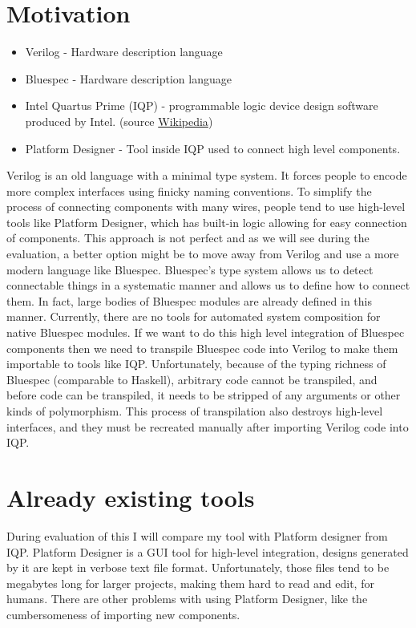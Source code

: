 \documentclass[12pt]{report}
\begin{document}
\section{Motivation}
\begin{tcolorbox}[title=Vocabulary]
    \begin{itemize}
        \item Verilog - Hardware description language
        \item Bluespec - Hardware description language
        \item Intel Quartus Prime (IQP) - programmable logic device design software produced by Intel. (source \href{https://en.wikipedia.org/wiki/Intel_Quartus_Prime}{Wikipedia})
        \item Platform Designer - Tool inside IQP used to connect high level components.
    \end{itemize}
\end{tcolorbox}
Verilog is an old language with a minimal type system. It forces people to encode more complex interfaces using finicky naming conventions. To simplify the process of connecting components with many wires, people tend to use high-level tools like Platform Designer, which has built-in logic allowing for easy connection of components. This approach is not perfect and as we will see during the evaluation, a better option might be to move away from Verilog and use a more modern language like Bluespec. Bluespec's type system allows us to detect connectable things in a systematic manner and allows us to define how to connect them. In fact, large bodies of Bluespec modules are already defined in this manner. Currently, there are no tools for automated system composition for native Bluespec modules. If we want to do this high level integration of Bluespec components then we need to transpile Bluespec code into Verilog to make them importable to tools like IQP. Unfortunately, because of the typing richness of Bluespec (comparable to Haskell), arbitrary code cannot be transpiled, and before code can be transpiled, it needs to be stripped of any arguments or other kinds of polymorphism. This process of transpilation also destroys high-level interfaces, and they must be recreated manually after importing Verilog code into IQP.

\section{Already existing tools}
During evaluation of this I will compare my tool with Platform designer from IQP. 
Platform Designer is a GUI tool for high-level integration, designs generated by it are kept in verbose text file format. Unfortunately, those files tend to be megabytes long for larger projects, making them hard to read and edit, for humans. 
There are other problems with using Platform Designer, like the cumbersomeness of importing new components.
\end{document}

